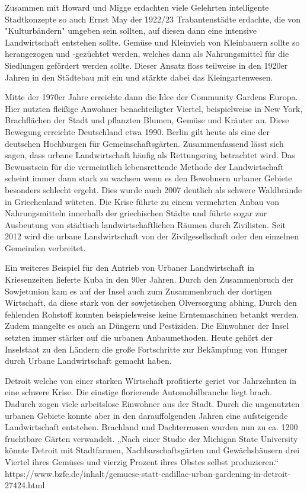 \documentclass{scrartcl}
\begin{document}
Zusammen mit Howard und Migge erdachten viele Gelehrten intelligente Stadtkonzepte so auch Ernst May der 1922/23 Trabantenstädte erdachte, die von "Kulturbändern" umgeben sein sollten, auf diesen dann eine intensive Landwirtschaft entstehen sollte. Gemüse und Kleinvieh von Kleinbauern sollte so herangezogen und -gezüchtet werden, welches dann als Nahrungsmittel für die Siedlungen gefördert werden sollte. Dieser Ansatz floss teilweise in den 1920er Jahren in den Städtebau mit ein und stärkte dabei das Kleingartenwesen.

Mitte der 1970er Jahre erreichte dann die Idee der Community Gardens Europa. Hier nutzten fleißige Anwohner benachteiligter Viertel, beispielweise in New York, Brachflächen der Stadt und pflanzten Blumen, Gemüse und Kräuter an. Diese Bewegung erreichte Deutschland etwa 1990. Berlin gilt heute als eine der deutschen Hochburgen für Gemeinschaftsgärten. Zusammenfassend lässt sich sagen, dass urbane Landwirtschaft häufig als Rettungsring betrachtet wird. Das Bewusstsein für die vermeintlich lebensrettende Methode der Landwirtschaft scheint immer dann stark zu wachsen wenn es den Bewohnern urbaner Gebiete besonders schlecht ergeht. Dies wurde auch 2007 deutlich als schwere Waldbrände in Griechenland wüteten. Die Krise führte zu einem vermehrten Anbau von Nahrungsmitteln innerhalb der griechischen Städte und führte sogar zur Ausbeutung von städtisch landwirtschaftlichen Räumen durch Zivilisten. Seit 2012 wird die urbane Landwirtschaft von der Zivilgesellschaft oder den einzelnen Gemeinden verbreitet.

Ein weiteres Beispiel für den Antrieb von Urbaner Landwirtschaft in Kriesenzeiten lieferte Kuba in den 90er Jahren. Durch den Zusammenbruch der Sowjetunion kam es auf der Insel auch zum Zusammenbruch der dortigen Wirtschaft, da diese stark von der sowjetischen Ölversorgung abhing. Durch den fehlenden Rohstoff konnten beispielsweise keine Erntemaschinen betankt werden. Zudem mangelte es auch an Düngern und Pestiziden. Die Einwohner der Insel setzten immer stärker auf die urbanen Anbaumethoden. Heute gehört der Inselstaat zu den Ländern die große Fortschritte zur Bekämpfung von Hunger durch Urbane Landwirtschaft gemacht haben.

Detroit welche von einer starken Wirtschaft profitierte geriet vor Jahrzehnten in eine schwere Krise. Die einstige florierende Automobilbranche liegt brach. Dadurch zogen viele arbeitslose Einwohner aus der Stadt. Durch die ungenutzten urbanen Gebiete konnte aber in den darauffolgenden Jahren eine aufsteigende Landwirtschaft entstehen. Brachland und Dachterrassen wurden nun zu ca. 1200 fruchtbare Gärten verwandelt. „Nach einer Studie der Michigan State University könnte Detroit mit Stadtfarmen, Nachbarschaftsgärten und Gewächshäusern drei Viertel ihres Gemüses und vierzig Prozent ihres Obstes selbst produzieren.“ https://www.bzfe.de/inhalt/gemuese-statt-cadillac-urban-gardening-in-detroit-27424.html
\end{document}
